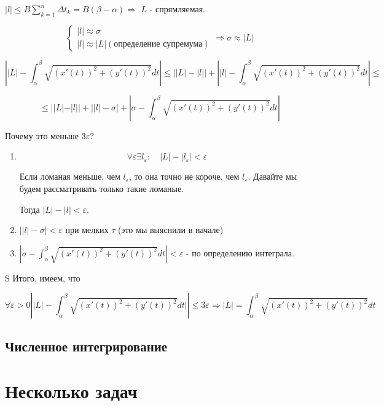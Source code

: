 \documentclass[a4paper]{article}
\begin{document}
\begin{definit}
\begin{hproof}
$|l| \leq B \sum_{k=1}^n \Delta t_k = B(\beta - \alpha) \Rightarrow$ $L$ - спрямляемая.

\[
\begin{cases}
|l| \approx \sigma \\
|l| \approx |L| (\text{определение супремума})
\end{cases} \Rightarrow \sigma \approx |L|
\]

\[
\left| |L| - \int_{\alpha}^{\beta} \sqrt{(x'(t))^2+(y'(t))^2} dt \right| \leq \left| |L| - |l| \right| + \left| |l| - \int_{\alpha}^{\beta} \sqrt{(x'(t))^2+(y'(t))^2} dt \right| \leq
\]

\[
\leq ||L|-|l|| + \left| |l| - \sigma \right| + \left| \sigma - \int_{\alpha}^{\beta}  \sqrt{(x'(t))^2+(y'(t))^2} dt \right|
\]

Почему это меньше $3\varepsilon$?

\begin{enumerate}
\item \[
\forall \varepsilon \exists l_{\varepsilon}: \quad |L| -|l_{\varepsilon}| < \varepsilon
\]

Если ломаная меньше, чем $l_{\varepsilon}$, то она точно не короче, чем $l_{\varepsilon}$. Давайте мы будем рассматривать только такие ломаные.

Тогда $|L| - |l| < \varepsilon$.
\item $\left| |l| - \sigma \right| < \varepsilon$ при мелких $\tau$ (это мы выяснили в начале)
\item $\left| \sigma - \int_{\alpha}^{\beta}  \sqrt{(x'(t))^2+(y'(t))^2} dt \right| < \varepsilon$ - по определению интеграла.

\end{enumerate}
S
Итого, имеем, что 

\[
\forall \varepsilon > 0 \left| |L| -  \int_{\alpha}^{\beta}  \sqrt{(x'(t))^2+(y'(t))^2} dt| \right| \leq 3\varepsilon \Rightarrow |L| = \int_{\alpha}^{\beta}  \sqrt{(x'(t))^2+(y'(t))^2} dt
\]

\end{hproof}

\end{definit}

\hypertarget{p21}{}
\subsection*{Численное интегрирование}
 


\hypertarget{tasks}{}
\section*{Несколько задач}
\end{document}
